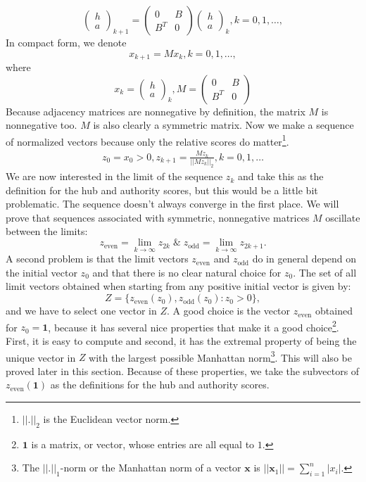 \documentclass[a4paper,11pt]{report}
\begin{document}
$$\begin{pmatrix} 
h\\
a
\end{pmatrix}_{k+1} = \begin{pmatrix} 
0 & B\\
B^T & 0
\end{pmatrix} \begin{pmatrix} 
h\\
a
\end{pmatrix}_{k}, k = 0, 1,\ldots,$$
In compact form, we denote
$$x_{k+1} = Mx_k, k= 0,1,\ldots,$$
where 
$$x_k = \begin{pmatrix} 
h\\
a
\end{pmatrix}_{k}, M =  \begin{pmatrix} 
0 & B\\
B^T & 0
\end{pmatrix}$$
Because adjacency matrices are nonnegative by definition, the matrix $M$ is 
nonnegative too. $M$ is also clearly a symmetric matrix. Now we make a sequence 
of normalized vectors because only the relative scores do matter\footnote{$||.||_2$ is the Euclidean vector norm.}. 
\begin{eqnarray}\label{sequencezk}
  z_0 = x_0 > 0, z_{k+1} = \frac{Mz_k}{||Mz_k||_2}, k = 0,1,\ldots
\end{eqnarray}
We are now interested in the limit of the sequence $z_k$ and take this as the definition for
the hub and authority scores, but this would be a little bit problematic. The sequence doesn't always converge in the first place. We will prove that 
sequences associated with symmetric, nonnegative matrices $M$ oscillate between the 
limits:
$$z_{\text{even}} = \lim_{k \to \infty} z_{2k} \; \& \; z_{\text{odd}} = \lim_{k \to \infty} z_{2k+1}.$$
A second problem is that the limit vectors $z_{\text{even}}$ and $z_{\text{odd}}$ 
do in general depend on the initial vector $z_0$ and that there is no clear 
natural choice for $z_0$. The set of all limit vectors obtained when starting 
from any positive initial vector is given by:
$$Z = \{z_{\text{even}}(z_0), z_{\text{odd}}(z_0): z_0 > 0\},$$
and we have to select one vector in $Z$. A good choice is the vector $z_{\text{even}}$ 
obtained for $z_0 = \mathbf{1}$, because it has several nice properties that make it a good choice\footnote{$\mathbf{1}$ is a matrix, or vector, whose entries are all equal to 
$1$.}.
First, it is easy to compute and second, it has the extremal property of being 
the unique vector in $Z$ with the largest possible Manhattan norm\footnote{The 
$||.||_1$-norm or the Manhattan norm of a vector $\mathbf{x}$ is 
$||\mathbf{x}_1|| = \sum^n_{i=1} |x_i|.$}. This will also be proved later in this section.
Because of these properties, we take the subvectors of $z_{\text{even}}(\mathbf{1})$ 
as the definitions for the hub and authority scores. \\
\end{document}
